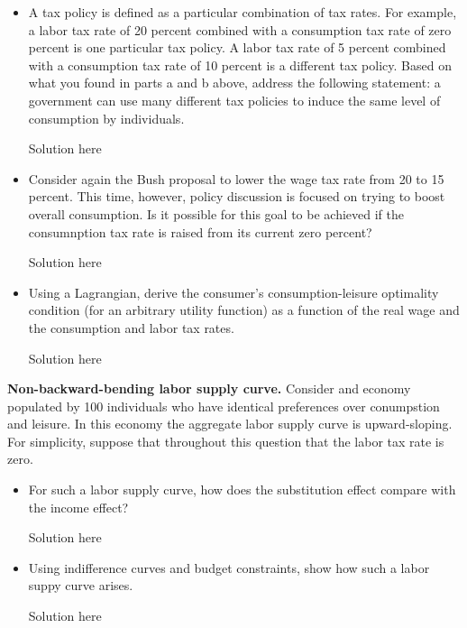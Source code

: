 \documentclass[11pt]{SelfArxOneColBMN}
\begin{document}
\begin{exercise}
\begin{itemize}
\item A tax policy is defined as a particular combination of tax rates. For example, a labor tax rate of 20 percent combined with a consumption tax rate of zero percent is one particular tax policy. A labor tax rate of 5 percent combined with a consumption tax rate of 10 percent is a different tax policy. Based on what you found in parts a and b above, address the following statement: a government can use many different tax policies to induce the same level of consumption by individuals.

        \begin{solution}
                Solution here
        \end{solution}


\item Consider again the Bush proposal to lower the wage tax rate from 20 to 15 percent. This time, however, policy discussion is focused on trying to boost overall consumption. Is it possible for this goal to be achieved if the consumnption tax rate is raised from its current zero percent?

        \begin{solution}
                Solution here
        \end{solution}


\item Using a Lagrangian, derive the consumer's consumption-leisure optimality condition (for an arbitrary utility function) as a function of the real wage and the consumption and labor tax rates.

        \begin{solution}
                Solution here
        \end{solution}


\end{itemize}
\end{exercise}

\begin{exercise}
	\textbf{Non-backward-bending labor supply curve.} Consider and economy populated by 100 individuals who have identical preferences over conumpstion and leisure. In this economy the aggregate labor supply curve is upward-sloping. For simplicity, suppose that throughout this question that the labor tax rate is zero.
\begin{itemize}
	\item For such a labor supply curve, how does the substitution effect compare with the income effect?
		\begin{solution}
			Solution here
		\end{solution}
	\item Using indifference curves and budget constraints, show how such a labor suppy curve arises. 
        \begin{solution}
                Solution here
        \end{solution}
\end{itemize}
\end{exercise}
\end{document}
